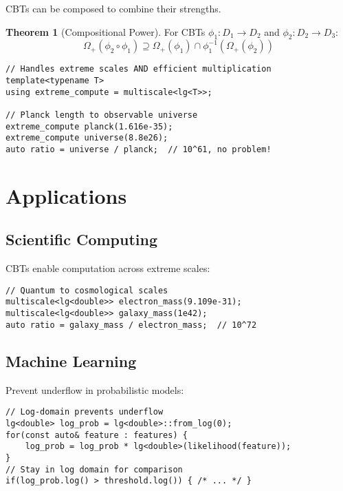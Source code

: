 \documentclass[12pt,a4paper]{article}
\theoremstyle{definition}
\newtheorem{theorem}{Theorem}
\begin{document}
CBTs can be composed to combine their strengths.

\begin{theorem}[Compositional Power]
For CBTs $\phi_1: D_1 \to D_2$ and $\phi_2: D_2 \to D_3$:
\begin{equation}
\Omega_{+}(\phi_2 \circ \phi_1) \supseteq \Omega_+(\phi_1) \cap \phi_1^{-1}(\Omega_+(\phi_2))
\end{equation}
\end{theorem}

\begin{lstlisting}[caption={Composed transform: multiscale<lg<T>>}]
// Handles extreme scales AND efficient multiplication
template<typename T>
using extreme_compute = multiscale<lg<T>>;

// Planck length to observable universe
extreme_compute planck(1.616e-35);
extreme_compute universe(8.8e26);
auto ratio = universe / planck;  // 10^61, no problem!
\end{lstlisting}

\section{Applications}

\subsection{Scientific Computing}

CBTs enable computation across extreme scales:

\begin{lstlisting}[caption={Multi-scale physics simulation}]
// Quantum to cosmological scales
multiscale<lg<double>> electron_mass(9.109e-31);
multiscale<lg<double>> galaxy_mass(1e42);
auto ratio = galaxy_mass / electron_mass;  // 10^72
\end{lstlisting}

\subsection{Machine Learning}

Prevent underflow in probabilistic models:

\begin{lstlisting}[caption={Stable probability computation}]
// Log-domain prevents underflow
lg<double> log_prob = lg<double>::from_log(0);
for(const auto& feature : features) {
    log_prob = log_prob * lg<double>(likelihood(feature));
}
// Stay in log domain for comparison
if(log_prob.log() > threshold.log()) { /* ... */ }
\end{lstlisting}
\end{document}
